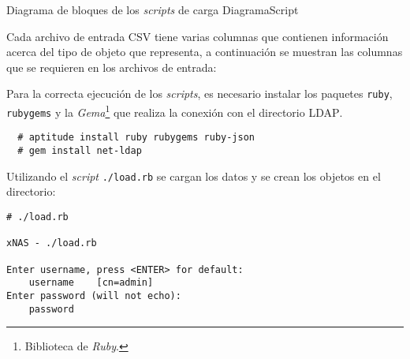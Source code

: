\diagramblock
{Diagrama de bloques de los \emph{\glspl{script}} de carga}
{DiagramaScript}
{
 {
  
 }
}

Cada archivo de entrada \textsc{CSV} tiene varias columnas que contienen informaci\'{o}n acerca del tipo de objeto que representa, a continuaci\'{o}n se muestran las columnas que se requieren en los archivos de entrada:

{
 \begin{table}[H]
 \caption{Formato de los archivos \textsc{CSV} para la carga de datos}{}
 \label{tab:csv-format}
 \noindent{} %
 \end{table}
}

Para la correcta ejecuci\'{o}n de los \emph{\glspl{script}}, es necesario instalar los paquetes \texttt{ruby}, \texttt{rubygems} y la \emph{\gls{Gema}}\footnote{Biblioteca de \emph{\gls{Ruby}}.} que realiza la conexi\'{o}n con el directorio \textsc{\gls{LDAP}}.

{
\scriptsize
\linespread{1}
\begin{verbatim}
  # aptitude install ruby rubygems ruby-json
  # gem install net-ldap
\end{verbatim}
}

Utilizando el \emph{\gls{script}} \texttt{./load.rb} se cargan los datos y se crean los objetos en el directorio:

{
\scriptsize
\linespread{1}
\begin{verbatim}
# ./load.rb

xNAS - ./load.rb

Enter username, press <ENTER> for default:
    username    [cn=admin]
Enter password (will not echo):
    password
\end{verbatim}
}


